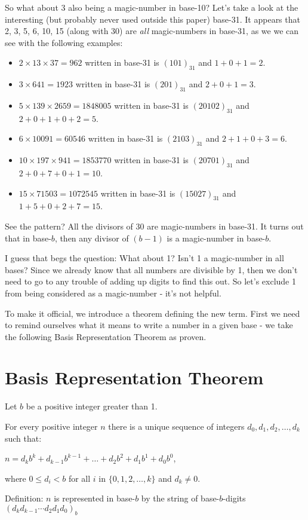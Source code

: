 \documentclass{article}
\newenvironment{jprIn}{\begin{adjustwidth}{2em}{}}{\end{adjustwidth}}
\begin{document}
So what about 3 also being a magic-number in base-10?  Let's take a look at the interesting (but probably never used outside this paper) base-31.
It appears that 2, 3, 5, 6, 10, 15 (along with 30) are \emph{all} magic-numbers in base-31, as we we can see
with the following examples:
\begin{itemize}
\item $2\times{}13\times{}37=962$ written in base-31 is $(101)_{31}$ and $1+0+1=2$.
\item $3\times{}641=1923$ written in base-31 is $(201)_{31}$ and $2+0+1=3$.
\item $5\times{}139\times{}2659=1848005$ written in base-31 is $(20102)_{31}$ and $2+0+1+0+2=5$.
\item $6\times{}10091=60546$ written in base-31 is $(2103)_{31}$ and $2+1+0+3=6$.
\item $10\times{}197\times{}941=1853770$ written in base-31 is $(20701)_{31}$ and $2+0+7+0+1=10$.
\item $15\times{}71503=1072545$ written in base-31 is $(15027)_{31}$ and $1+5+0+2+7=15$.
\end{itemize}

See the pattern? All the divisors of 30 are magic-numbers in base-31.
It turns out that in base-$b$, then any divisor of $(b-1)$ is a magic-number in base-$b$.

I guess that begs the question: What about 1? Isn't 1 a magic-number in all bases?
Since we already know that all numbers are divisible by 1,
then we don't need to go to any trouble of adding up digits to find this out.
So let's exclude 1 from being considered as a magic-number - it's not helpful.

To make it official, we introduce a theorem defining the new term. First we need to remind ourselves
what it means to write a number in a given base - we take the following Basis Representation Theorem as proven.

\section*{Basis Representation Theorem}
\begin{jprIn}
Let $b$ be a positive integer greater than 1.

For every positive integer $n$ there is a unique sequence
of integers $d_0, d_1, d_2,\dots{},d_k$ such that:

\hspace{3em}$n=d_kb^k+d_{k-1}b^{k-1}+\dots+d_2b^2+d_1b^1+d_0b^0$,

where $0\le{}d_i<b$ for all $i$ in $\{0,1,2,\dots{},k\}$ and $d_k\ne0$.

Definition: $n$ is represented in base-$b$ by the string
of base-$b$-digits $(d_kd_{k-1}{\cdots}d_2d_1d_0)_b$
\end{jprIn}
\end{document}

